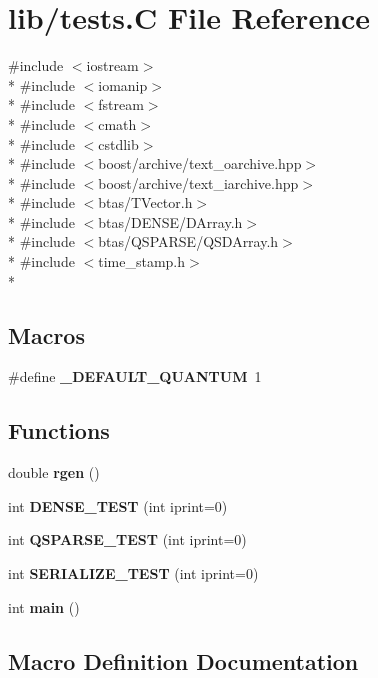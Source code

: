 \section{lib/tests.C File Reference}
\label{d6/dd2/tests_8C}
{\ttfamily \#include $<$iostream$>$}\\*
{\ttfamily \#include $<$iomanip$>$}\\*
{\ttfamily \#include $<$fstream$>$}\\*
{\ttfamily \#include $<$cmath$>$}\\*
{\ttfamily \#include $<$cstdlib$>$}\\*
{\ttfamily \#include $<$boost/archive/text\-\_\-oarchive.\-hpp$>$}\\*
{\ttfamily \#include $<$boost/archive/text\-\_\-iarchive.\-hpp$>$}\\*
{\ttfamily \#include $<$btas/\-T\-Vector.\-h$>$}\\*
{\ttfamily \#include $<$btas/\-D\-E\-N\-S\-E/\-D\-Array.\-h$>$}\\*
{\ttfamily \#include $<$btas/\-Q\-S\-P\-A\-R\-S\-E/\-Q\-S\-D\-Array.\-h$>$}\\*
{\ttfamily \#include $<$time\-\_\-stamp.\-h$>$}\\*
\subsection*{Macros}
\begin{DoxyCompactItemize}
\item 
\#define {\bf \-\_\-\-D\-E\-F\-A\-U\-L\-T\-\_\-\-Q\-U\-A\-N\-T\-U\-M}~1
\end{DoxyCompactItemize}
\subsection*{Functions}
\begin{DoxyCompactItemize}
\item 
double {\bf rgen} ()
\item 
int {\bf D\-E\-N\-S\-E\-\_\-\-T\-E\-S\-T} (int iprint=0)
\item 
int {\bf Q\-S\-P\-A\-R\-S\-E\-\_\-\-T\-E\-S\-T} (int iprint=0)
\item 
int {\bf S\-E\-R\-I\-A\-L\-I\-Z\-E\-\_\-\-T\-E\-S\-T} (int iprint=0)
\item 
int {\bf main} ()
\end{DoxyCompactItemize}


\subsection{Macro Definition Documentation}
